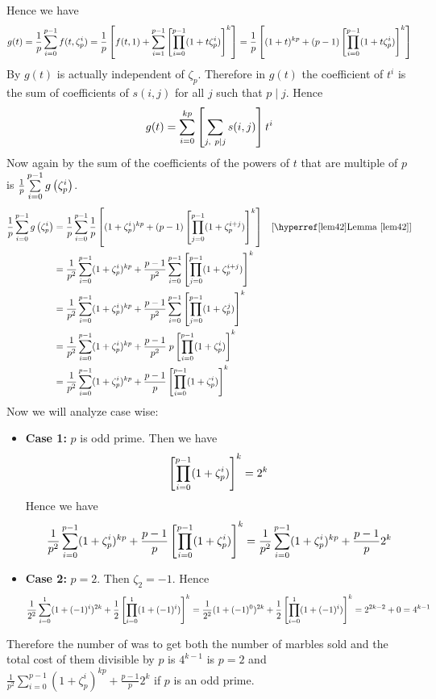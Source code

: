 \documentclass[a4paper, 11pt]{article}
\begin{document}
{Hence we have $$g(t)=\frac1p\sum\limits_{i=0}^{p-1}f(t,\zeta_p^i)=\frac1p\left[f(t,1)+\sum_{i=1}^{p-1}\left[ \prod\limits_{i=0}^{p-1}(1+t\zeta_p^i)\right]^k\right]=\frac1p\left[ (1+t)^{kp} +(p-1)\left[ \prod\limits_{i=0}^{p-1}(1+t\zeta_p^i)\right]^k\right]$$By  $g(t)$ is actually independent of $\zeta_p$. Therefore in $g(t)$ the coefficient of $t^i$ is the sum of coefficients of $s(i,j)$ for all $j$ such that $p\mid j$. Hence $$g(t)=\sum_{i=0}^{kp}\lt[\sum_{j,\ p\mid j}s(i,j)\rt]t^i$$Now again by  the sum of the coefficients of the powers of $t$ that are multiple of $p$ is $\frac1p\sum\limits_{i=0}^{p-1}g\left(\zeta_p^i\right)$. \begin{align*}
	\frac1p\sum\limits_{i=0}^{p-1}g\lt(\zeta_p^i\rt) & = \frac1p\sum\limits_{i=0}^{p-1}\frac1p\lt[ (1+\zeta_p^{i})^{kp} +(p-1)\lt[ \prod\limits_{j=0}^{p-1}(1+\zeta_p^{i+j})\rt]^k\rt] & [\text{\lemref{lem42}}]\\
	& = \frac1{p^2}\sum\limits_{i=0}^{p-1}(1+\zeta_p^{i})^{kp}+\frac{p-1}{p^2}\sum\limits_{i=0}^{p-1}\lt[ \prod\limits_{j=0}^{p-1}(1+\zeta_p^{i+j})\rt]^k\\
	& = \frac1{p^2}\sum\limits_{i=0}^{p-1}(1+\zeta_p^{i})^{kp}+\frac{p-1}{p^2}\sum\limits_{i=0}^{p-1}\lt[ \prod\limits_{j=0}^{p-1}(1+\zeta_p^{j})\rt]^k\\
	& = \frac1{p^2}\sum\limits_{i=0}^{p-1}(1+\zeta_p^{i})^{kp}+\frac{p-1}{p^2}\;p\lt[ \prod\limits_{i=0}^{p-1}(1+\zeta_p^{i})\rt]^k\\
	& = \frac1{p^2}\sum\limits_{i=0}^{p-1}(1+\zeta_p^{i})^{kp}+\frac{p-1}{p}\lt[ \prod\limits_{i=0}^{p-1}(1+\zeta_p^{i})\rt]^k
\end{align*}Now we will analyze case wise:
\begin{itemize}
	\item \textbf{Case 1:} $p$ is odd prime. Then we have $$\left[ \prod\limits_{i=0}^{p-1}(1+\zeta_p^{i})\right]^k=2^k$$Hence we have $$\frac1{p^2}\sum\limits_{i=0}^{p-1}(1+\zeta_p^{i})^{kp}+\frac{p-1}{p}\left[ \prod\limits_{i=0}^{p-1}(1+\zeta_p^{i})\right]^k=\frac1{p^2}\sum\limits_{i=0}^{p-1}(1+\zeta_p^{i})^{kp}+\frac{p-1}{p}2^k$$
	\item \textbf{Case 2:} $p=2$. Then $\zeta_2=-1$. Hence $$\frac1{2^2}\sum\limits_{i=0}^{1}(1+(-1)^{i})^{2k}+\frac{1}{2}\left[ \prod\limits_{i=0}^{1}(1+(-1)^{i})\right]^k=\frac1{2^2}(1+(-1)^{0})^{2k}+\frac{1}{2}\left[ \prod\limits_{i=0}^{1}(1+(-1)^{i})\right]^k=2^{2k-2}+0=4^{k-1}$$
\end{itemize}Therefore the number of was to get both the number of marbles sold and the total cost of them divisible by $p$ is $4^{k-1}$ is $p=2$ and $\frac1{p^2}\sum\limits_{i=0}^{p-1}(1+\zeta_p^{i})^{kp}+\frac{p-1}{p}2^k$ if $p$ is an odd prime. 
}\parinf
\end{document}
